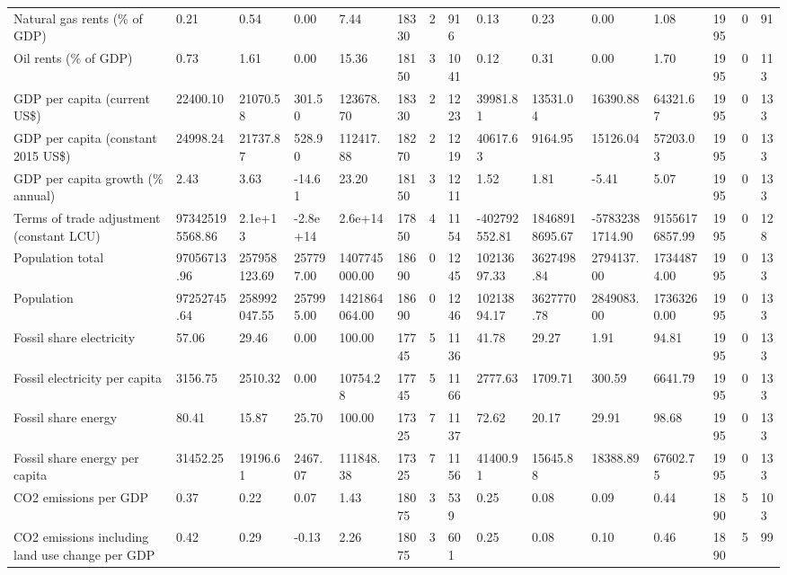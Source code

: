 \begin{longtable}{lllllllllllllll}
\addlinespace
Natural gas rents (\% of GDP) & 0.21 & 0.54 & 0.00 & 7.44 & 18330 & 2 & 916 & 0.13 & 0.23 & 0.00 & 1.08 & 1995 & 0 & 91\\
Oil rents (\% of GDP) & 0.73 & 1.61 & 0.00 & 15.36 & 18150 & 3 & 1041 & 0.12 & 0.31 & 0.00 & 1.70 & 1995 & 0 & 113\\
GDP per capita (current US\$) & 22400.10 & 21070.58 & 301.50 & 123678.70 & 18330 & 2 & 1223 & 39981.81 & 13531.04 & 16390.88 & 64321.67 & 1995 & 0 & 133\\
GDP per capita (constant 2015 US\$) & 24998.24 & 21737.87 & 528.90 & 112417.88 & 18270 & 2 & 1219 & 40617.63 & 9164.95 & 15126.04 & 57203.03 & 1995 & 0 & 133\\
GDP per capita growth (\% annual) & 2.43 & 3.63 & -14.61 & 23.20 & 18150 & 3 & 1211 & 1.52 & 1.81 & -5.41 & 5.07 & 1995 & 0 & 133\\
\addlinespace
Terms of trade adjustment (constant LCU) & 973425195568.86 & 2.1e+13 & -2.8e+14 & 2.6e+14 & 17850 & 4 & 1154 & -402792552.81 & 18468918695.67 & -57832381714.90 & 91556176857.99 & 1995 & 0 & 128\\
Population total & 97056713.96 & 257958123.69 & 257797.00 & 1407745000.00 & 18690 & 0 & 1245 & 10213697.33 & 3627498.84 & 2794137.00 & 17344874.00 & 1995 & 0 & 133\\
Population & 97252745.64 & 258992047.55 & 257995.00 & 1421864064.00 & 18690 & 0 & 1246 & 10213894.17 & 3627770.78 & 2849083.00 & 17363260.00 & 1995 & 0 & 133\\
Fossil share electricity & 57.06 & 29.46 & 0.00 & 100.00 & 17745 & 5 & 1136 & 41.78 & 29.27 & 1.91 & 94.81 & 1995 & 0 & 133\\
Fossil electricity per capita & 3156.75 & 2510.32 & 0.00 & 10754.28 & 17745 & 5 & 1166 & 2777.63 & 1709.71 & 300.59 & 6641.79 & 1995 & 0 & 133\\
\addlinespace
Fossil share energy & 80.41 & 15.87 & 25.70 & 100.00 & 17325 & 7 & 1137 & 72.62 & 20.17 & 29.91 & 98.68 & 1995 & 0 & 133\\
Fossil share energy per capita & 31452.25 & 19196.61 & 2467.07 & 111848.38 & 17325 & 7 & 1156 & 41400.91 & 15645.88 & 18388.89 & 67602.75 & 1995 & 0 & 133\\
CO2 emissions per GDP & 0.37 & 0.22 & 0.07 & 1.43 & 18075 & 3 & 539 & 0.25 & 0.08 & 0.09 & 0.44 & 1890 & 5 & 103\\
CO2 emissions including land use change per GDP & 0.42 & 0.29 & -0.13 & 2.26 & 18075 & 3 & 601 & 0.25 & 0.08 & 0.10 & 0.46 & 1890 & 5 & 99\\

\end{longtable}
